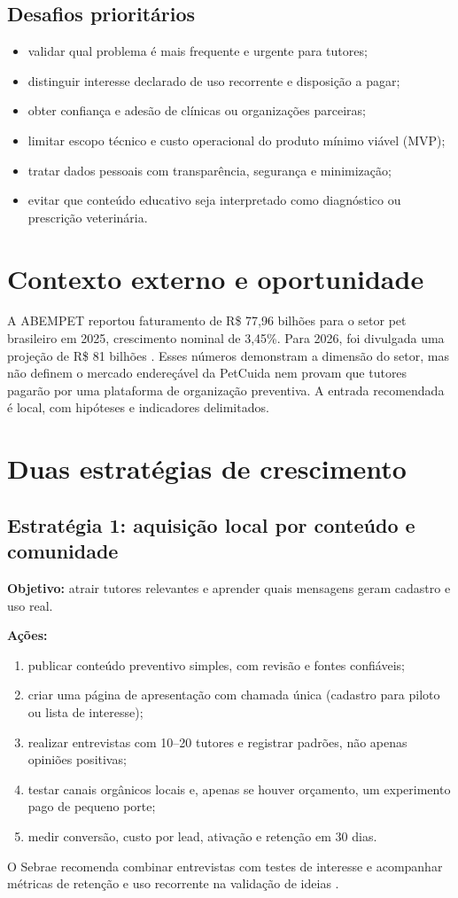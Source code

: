 \documentclass[12pt,a4paper]{article}
\begin{document}
\subsection{Desafios prioritários}
\begin{itemize}[leftmargin=*]
\item validar qual problema é mais frequente e urgente para tutores;
\item distinguir interesse declarado de uso recorrente e disposição a pagar;
\item obter confiança e adesão de clínicas ou organizações parceiras;
\item limitar escopo técnico e custo operacional do produto mínimo viável (MVP);
\item tratar dados pessoais com transparência, segurança e minimização;
\item evitar que conteúdo educativo seja interpretado como diagnóstico ou prescrição veterinária.
\end{itemize}

\section{Contexto externo e oportunidade}
A ABEMPET reportou faturamento de R\$ 77,96 bilhões para o setor pet brasileiro em 2025, crescimento nominal de 3,45\%. Para 2026, foi divulgada uma projeção de R\$ 81 bilhões \cite{abempet2026}. Esses números demonstram a dimensão do setor, mas não definem o mercado endereçável da PetCuida nem provam que tutores pagarão por uma plataforma de organização preventiva. A entrada recomendada é local, com hipóteses e indicadores delimitados.

\section{Duas estratégias de crescimento}
\subsection{Estratégia 1: aquisição local por conteúdo e comunidade}
\textbf{Objetivo:} atrair tutores relevantes e aprender quais mensagens geram cadastro e uso real.

\textbf{Ações:}
\begin{enumerate}[leftmargin=*]
\item publicar conteúdo preventivo simples, com revisão e fontes confiáveis;
\item criar uma página de apresentação com chamada única (cadastro para piloto ou lista de interesse);
\item realizar entrevistas com 10--20 tutores e registrar padrões, não apenas opiniões positivas;
\item testar canais orgânicos locais e, apenas se houver orçamento, um experimento pago de pequeno porte;
\item medir conversão, custo por lead, ativação e retenção em 30 dias.
\end{enumerate}
O Sebrae recomenda combinar entrevistas com testes de interesse e acompanhar métricas de retenção e uso recorrente na validação de ideias \cite{sebrae}.
\end{document}
